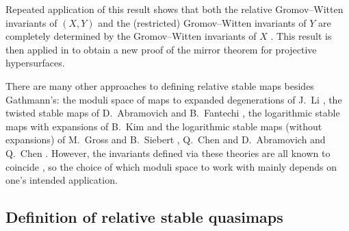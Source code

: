 Repeated application of this result shows that both the relative Gromov--Witten invariants of $(X,Y)$ and the (restricted) Gromov--Witten invariants of $Y$ are completely determined by the Gromov--Witten invariants of $X$ \cite[Corollary 5.7]{Ga}. This result is then applied in \cite{Ga-MF} to obtain a new proof of the mirror theorem for projective hypersurfaces.

\begin{remark} There are many other approaches to defining relative stable maps besides Gathmann's: the moduli space of maps to expanded degenerations of J.~Li \cite{Li1} \cite{Li2}, the twisted stable maps of D.~Abramovich and B.~Fantechi \cite{AbramovichFantechi}, the logarithmic stable maps with expansions of B.~Kim \cite{KimLog} and the logarithmic stable maps (without expansions) of M.~Gross and B.~Siebert \cite{GrossSiebertLog} \cite{GrossSiebertIntrinsic}, Q.~Chen \cite{ChenLog} and D.~Abramovich and Q.~Chen \cite{AbramovichChenLog}. However, the invariants defined via these theories are all known to coincide \cite{AbramovichMarcusWiseComparison}, so the choice of which moduli space to work with mainly depends on one's intended application. \end{remark}

\subsection{Definition of relative stable quasimaps} \label{Subsection relative stable quasimaps}


